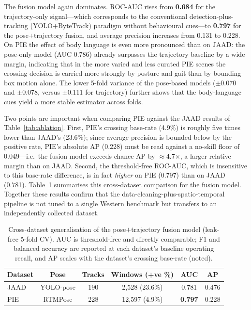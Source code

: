 The fusion model again dominates. ROC-AUC rises from \textbf{0.684} for the
trajectory-only signal---which corresponds to the conventional
detection-plus-tracking (YOLO$+$ByteTrack) paradigm without behavioural
cues---to \textbf{0.797} for the pose$+$trajectory fusion, and average precision
increases from 0.131 to 0.228. On PIE the effect of body language is even more
pronounced than on JAAD: the pose-only model (AUC 0.786) already surpasses the
trajectory baseline by a wide margin, indicating that in the more varied and
less curated PIE scenes the crossing decision is carried more strongly by
posture and gait than by bounding-box motion alone. The lower 5-fold variance of
the pose-based models ($\pm$0.070 and $\pm$0.078, versus $\pm$0.111 for
trajectory) further shows that the body-language cues yield a more stable
estimator across folds.

Two points are important when comparing PIE against the JAAD results of
Table~\ref{tab:ablation}. First, PIE's crossing base-rate (4.9\%) is roughly five
times lower than JAAD's (23.6\%); since average precision is bounded below by the
positive rate, PIE's absolute AP (0.228) must be read against a no-skill floor of
0.049---i.e.\ the fusion model exceeds chance AP by $\approx$4.7$\times$, a larger
relative margin than on JAAD. Second, the threshold-free ROC-AUC, which is
insensitive to this base-rate difference, is in fact \emph{higher} on PIE (0.797)
than on JAAD (0.781). Table~\ref{tab:crossdataset} summarises this cross-dataset
comparison for the fusion model. Together these results confirm that the
data-cleaning-plus-spatio-temporal pipeline is not tuned to a single Western
benchmark but transfers to an independently collected dataset.

\begin{table}[t]
\centering
\small
\setlength{\tabcolsep}{4pt}
\renewcommand{\arraystretch}{1.15}
\caption{Cross-dataset generalisation of the pose$+$trajectory fusion model
(leak-free 5-fold CV). AUC is threshold-free and directly comparable; F1 and
balanced accuracy are reported at each dataset's baseline operating recall, and
AP scales with the dataset's crossing base-rate (noted).}
\label{tab:crossdataset}
\begin{tabular}{|l|c|c|c|c|c|}
\hline
\textbf{Dataset} & \textbf{Pose} & \textbf{Tracks} & \textbf{Windows (+ve \%)} & \textbf{AUC} & \textbf{AP} \\
\hline
JAAD & YOLO-pose & 190 & 2{,}528 (23.6\%) & 0.781 & 0.476 \\ \hline
PIE  & RTMPose  & 228 & 12{,}597 (4.9\%) & \textbf{0.797} & 0.228 \\ \hline
\end{tabular}
\end{table}

